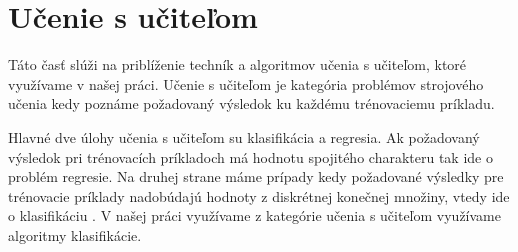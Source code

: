 \section{Učenie s učiteľom}
Táto časť slúži na priblíženie techník a algoritmov učenia s učiteľom, ktoré využívame v našej práci. Učenie s učiteľom je kategória problémov strojového učenia kedy poznáme požadovaný výsledok ku každému trénovaciemu príkladu.\par
Hlavné dve úlohy učenia s učiteľom su klasifikácia a regresia. Ak požadovaný výsledok pri trénovacích príkladoch má hodnotu spojitého charakteru tak ide o problém regresie. Na druhej strane máme prípady kedy požadované výsledky pre trénovacie príklady nadobúdajú hodnoty z diskrétnej konečnej množiny, vtedy ide o klasifikáciu \cite{Goodfellow-et-al-2016}. V našej práci využívame z kategórie učenia s učiteľom využívame algoritmy klasifikácie.
